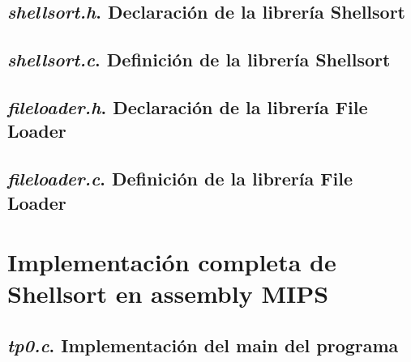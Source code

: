 \documentclass{article}
\begin{document}
\begin{appendices}
\subsection{\textit{shellsort.h}. Declaración de la librería Shellsort}
%  

\subsection{\textit{shellsort.c}. Definición de la librería Shellsort}
%  

\subsection{\textit{fileloader.h}. Declaración de la librería File Loader}
%  

\subsection{\textit{fileloader.c}. Definición de la librería File Loader}
%  




\section{Implementación completa de Shellsort en assembly MIPS}


\subsection{\textit{tp0.c}. Implementación del main del programa}
%  
\bigskip\bigskip


\end{appendices}
\end{document}
